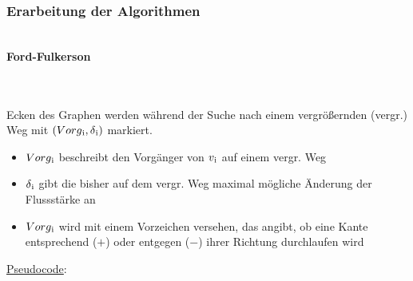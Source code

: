 \documentclass[11pt]{article}
\begin{document}
    \subsubsection{Erarbeitung der Algorithmen}
    \begin{Large}
        \textbf{\\Ford-Fulkerson}
    \end{Large}\\~\\
    Ecken des Graphen werden w\"ahrend der Suche nach einem vergr\"o\ss{}ernden (vergr.) Weg mit $(Vorg\textsubscript{i},\delta\textsubscript{i})$ markiert.
    \begin{itemize}
        \item $Vorg\textsubscript{i}$ beschreibt den Vorg\"anger von $v\textsubscript{i}$ auf einem vergr. Weg
        \item $\delta\textsubscript{i}$ gibt die bisher auf dem vergr. Weg maximal m\"ogliche \"Anderung der Flussst\"arke an
        \item $Vorg\textsubscript{i}$ wird mit einem Vorzeichen versehen, das angibt, ob eine Kante entsprechend ($+$) oder entgegen ($-$) ihrer Richtung durchlaufen wird
    \end{itemize}
    \newpage
    \underline{Pseudocode}:
\end{document}
